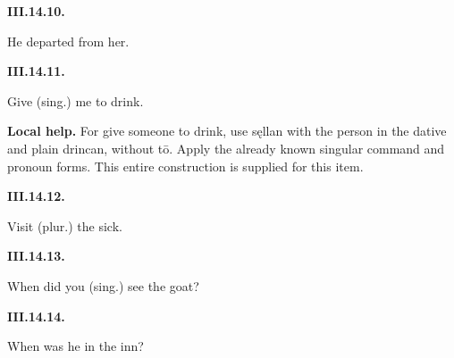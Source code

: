 \par\begin{minipage}{\linewidth}\raggedright
\textbf{III.14.10.}

He departed from her.

\end{minipage}\par\addvspace{4pt}

\par\begin{minipage}{\linewidth}\raggedright
\textbf{III.14.11.}

Give (sing.) me to drink.

\end{minipage}\par\addvspace{4pt}

\textbf{Local help.} For give someone to drink, use sęllan with the person in the dative and plain drincan, without tō. Apply the already known singular command and pronoun forms. This entire construction is supplied for this item.

\par\begin{minipage}{\linewidth}\raggedright
\textbf{III.14.12.}

Visit (plur.) the sick.

\end{minipage}\par\addvspace{4pt}

\par\begin{minipage}{\linewidth}\raggedright
\textbf{III.14.13.}

When did you (sing.) see the goat?

\end{minipage}\par\addvspace{4pt}

\par\begin{minipage}{\linewidth}\raggedright
\textbf{III.14.14.}

When was he in the inn?

\end{minipage}\par\addvspace{4pt}

